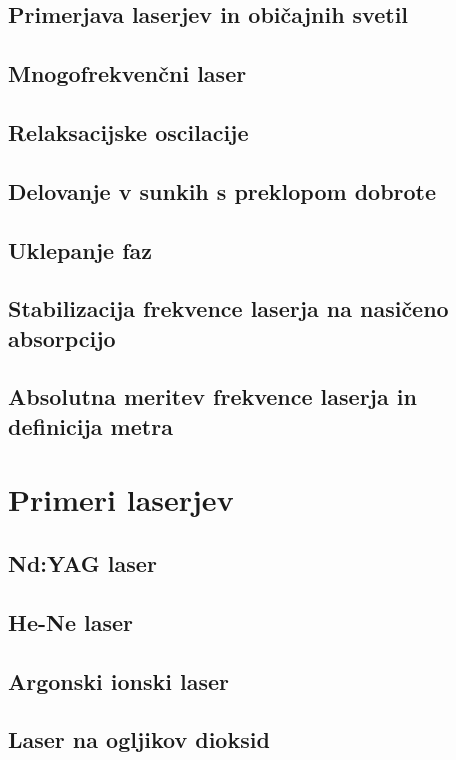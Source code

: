 \documentclass[11pt,fleqn]{book} %
\begin{document}
\section{Primerjava laserjev in običajnih svetil}
\section{Mnogofrekvenčni laser}
\section{Relaksacijske oscilacije}
\section{Delovanje v sunkih s preklopom dobrote}
\section{Uklepanje faz}
\section{Stabilizacija frekvence laserja na nasičeno absorpcijo}
\section{Absolutna meritev frekvence laserja in definicija metra}



%
\chapter{Primeri laserjev}
\section{Nd:YAG laser}
\section{He-Ne laser}
\section{Argonski ionski laser}
\section{Laser na ogljikov dioksid}
\end{document}

